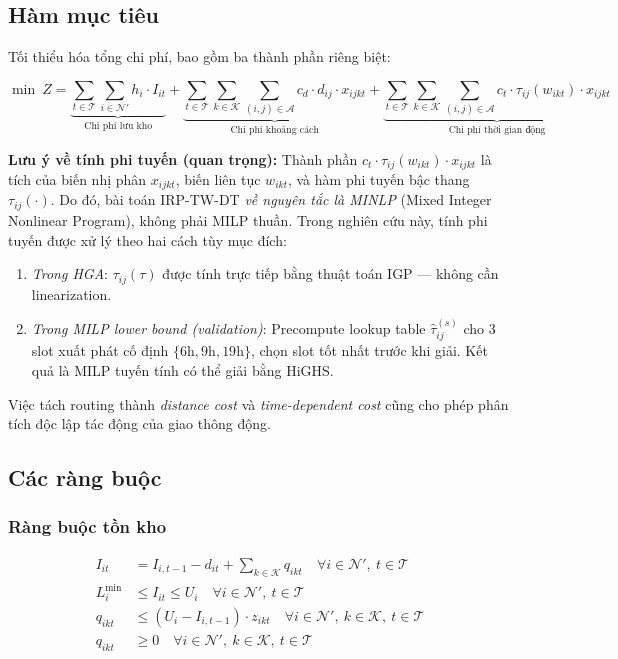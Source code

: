 \documentclass[12pt,a4paper]{article}
\newcommand{\T}{\mathcal{T}}
\newcommand{\N}{\mathcal{N}}
\newcommand{\K}{\mathcal{K}}
\newcommand{\A}{\mathcal{A}}
\newcommand{\tij}{\tau_{ij}}
\begin{document}
\subsection{Hàm mục tiêu}

Tối thiểu hóa tổng chi phí, bao gồm ba thành phần riêng biệt:

\begin{equation}
  \min\ Z = \underbrace{\sum_{t \in \T} \sum_{i \in \N'} h_i \cdot I_{it}}_{\text{Chi phí lưu kho}}
        + \underbrace{\sum_{t \in \T} \sum_{k \in \K} \sum_{(i,j) \in \A}
                c_d \cdot d_{ij} \cdot x_{ijkt}}_{\text{Chi phí khoảng cách}}
        + \underbrace{\sum_{t \in \T} \sum_{k \in \K} \sum_{(i,j) \in \A}
                c_t \cdot \tij(w_{ikt}) \cdot x_{ijkt}}_{\text{Chi phí thời gian động}}
  \label{eq:obj}
\end{equation}

\noindent
\textbf{Lưu ý về tính phi tuyến (quan trọng):} Thành phần $c_t \cdot \tij(w_{ikt}) \cdot x_{ijkt}$
là tích của biến nhị phân $x_{ijkt}$, biến liên tục $w_{ikt}$, và hàm phi tuyến bậc thang
$\tij(\cdot)$. Do đó, bài toán IRP-TW-DT \textit{về nguyên tắc là MINLP} (Mixed Integer
Nonlinear Program), không phải MILP thuần. Trong nghiên cứu này, tính phi tuyến được xử lý
theo hai cách tùy mục đích:
\begin{enumerate}[noitemsep, label=(\roman*)]
  \item \textit{Trong HGA}: $\tij(\tau)$ được tính trực tiếp bằng thuật toán IGP --- không
        cần linearization.
  \item \textit{Trong MILP lower bound (validation)}: Precompute lookup table $\hat{\tau}_{ij}^{(s)}$
        cho 3 slot xuất phát cố định $\{6\text{h}, 9\text{h}, 19\text{h}\}$, chọn slot tốt
        nhất trước khi giải. Kết quả là MILP tuyến tính có thể giải bằng HiGHS.
\end{enumerate}
Việc tách routing thành \textit{distance cost} và \textit{time-dependent cost} cũng cho
phép phân tích độc lập tác động của giao thông động.

\subsection{Các ràng buộc}

\subsubsection{Ràng buộc tồn kho}

\begin{align}
  I_{it} &= I_{i,t-1} - d_{it} + \sum_{k \in \K} q_{ikt}
             \quad \forall i \in \N',\ t \in \T
             \label{eq:inv_balance} \\
  L_i^{\min} &\leq I_{it} \leq U_i
             \quad \forall i \in \N',\ t \in \T
             \label{eq:inv_bounds} \\
  q_{ikt} &\leq (U_i - I_{i,t-1}) \cdot z_{ikt}
             \quad \forall i \in \N',\ k \in \K,\ t \in \T
             \label{eq:order_up} \\
  q_{ikt} &\geq 0
             \quad \forall i \in \N',\ k \in \K,\ t \in \T
             \label{eq:q_nonneg}
\end{align}
\end{document}

